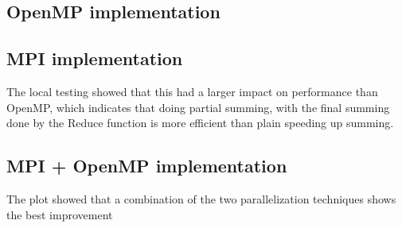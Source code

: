 \documentclass[fontsize=11pt,paper=a4,titlepage]{report}
\begin{document}
\subsection{OpenMP implementation}

\subsection{MPI implementation}
The local testing showed that this had a larger impact on performance than OpenMP, which indicates that doing partial summing, with the final summing done by the Reduce function is more efficient than plain speeding up summing.

\subsection{MPI + OpenMP implementation}
The plot showed that a combination of the two parallelization techniques shows the best improvement  
\end{document}
